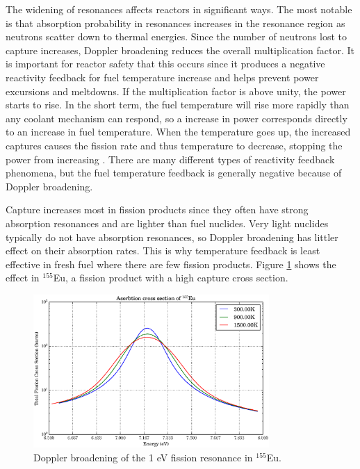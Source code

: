 The widening of resonances affects reactors in significant ways.  The most notable is that absorption probability in resonances increases in the resonance region as neutrons scatter down to thermal energies.  Since the number of neutrons lost to capture increases, Doppler broadening reduces the overall multiplication factor.  It is important for reactor safety that this occurs since it produces a negative reactivity feedback for fuel temperature increase and helps prevent power excursions and meltdowns.  If the multiplication factor is above unity, the power starts to rise.  In the short term, the fuel temperature will rise more rapidly than any coolant mechanism can respond, so a increase in power corresponds directly to an increase in fuel temperature.
  When the temperature goes up, the increased captures causes the fission rate and thus temperature to decrease, stopping the power from increasing \cite{duderstadt}. There are many different types of reactivity feedback phenomena, but the fuel temperature feedback is generally negative because of Doppler broadening.  
  
Capture increases most in fission products since they often have strong absorption resonances and are lighter than fuel nuclides.  Very light nuclides typically do not have absorption resonances, so Doppler broadening has littler effect on their absorption rates.
  This is why temperature feedback is least effective in fresh fuel where there are few fission products.  Figure \ref{xs_eu_broaden} shows the effect in  $^{155}$Eu, a fission product with a high capture cross section.

\begin{figure}[h!]
  \centering
    \includegraphics[width=0.8\textwidth]{graphics/xs_eu_broaden.eps}
     \caption{Doppler broadening of the 1 eV fission resonance in  $^{155}$Eu.  \label{xs_eu_broaden}}
\end{figure}

